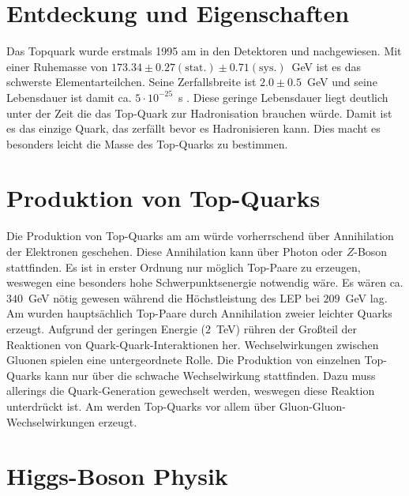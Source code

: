 \section{Entdeckung und Eigenschaften}
Das Topquark wurde erstmals 1995 am \tevatron in den Detektoren \dzero und \cdf nachgewiesen. Mit einer Ruhemasse von $173.34 \pm 0.27(\text{stat.}) \pm 0.71 (\text{sys.})$~GeV ist es das schwerste Elementarteilchen. Seine Zerfallsbreite ist $2.0\pm0.5$~GeV und seine Lebensdauer ist damit ca. $5\cdot10^{-25}$~s . Diese geringe Lebensdauer liegt deutlich unter der Zeit die das Top-Quark zur Hadronisation brauchen würde. Damit ist es das einzige Quark, das zerfällt bevor es Hadronisieren kann. Dies macht es besonders leicht die Masse des Top-Quarks zu bestimmen.
 
\section{Produktion von Top-Quarks}
Die Produktion von Top-Quarks am \lep am \cern würde vorherrschend über Annihilation der Elektronen geschehen. Diese Annihilation kann über Photon oder $Z$-Boson stattfinden. Es ist in erster Ordnung nur möglich Top-Paare zu erzeugen, weswegen eine besonders hohe Schwerpunktsenergie notwendig wäre. Es wären ca. $340$~GeV nötig gewesen während die Höchstleistung des LEP bei $209$~GeV lag. Am \tevatron wurden hauptsächlich Top-Paare durch Annihilation zweier leichter Quarks erzeugt. Aufgrund der geringen Energie ($2$~TeV) rühren der Großteil der Reaktionen von Quark-Quark-Interaktionen her. Wechselwirkungen zwischen Gluonen spielen eine untergeordnete Rolle. Die Produktion von einzelnen Top-Quarks kann nur über die schwache Wechselwirkung stattfinden. Dazu muss allerings die Quark-Generation gewechselt werden, weswegen diese Reaktion unterdrückt ist. Am \lhc werden Top-Quarks vor allem über Gluon-Gluon-Wechselwirkungen erzeugt. 

\section{Higgs-Boson Physik}
